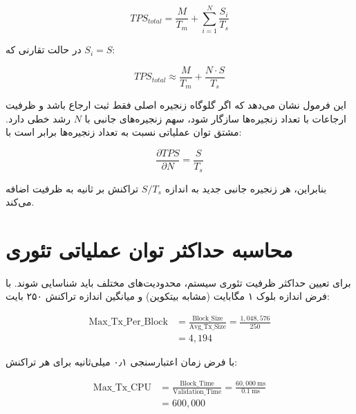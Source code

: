 \begin{latin}
\begin{equation}
TPS_{total} = \frac{M}{T_m} + \sum_{i=1}^{N}\frac{S_i}{T_s}
\end{equation}
\end{latin}

در حالت تقارنی که \(S_i = S\):

\begin{latin}
\begin{equation}
TPS_{total} \approx \frac{M}{T_m} + \frac{N \cdot S}{T_s}
\end{equation}
\end{latin}

این فرمول نشان می‌دهد که اگر گلوگاه زنجیره اصلی فقط ثبت ارجاع باشد و ظرفیت ارجاعات با تعداد زنجیره‌ها سازگار شود، سهم زنجیره‌های جانبی با \(N\) رشد خطی دارد. مشتق توان عملیاتی نسبت به تعداد زنجیره‌ها برابر است با:

\begin{latin}
\begin{equation}
\frac{\partial TPS}{\partial N} = \frac{S}{T_s}
\end{equation}
\end{latin}

بنابراین، هر زنجیره جانبی جدید به اندازه \(S/T_s\) تراکنش بر ثانیه به ظرفیت اضافه می‌کند.

\section{محاسبه حداکثر توان عملیاتی تئوری}

برای تعیین حداکثر ظرفیت تئوری سیستم، محدودیت‌های مختلف باید شناسایی شوند. با فرض اندازه بلوک ۱ مگابایت (مشابه بیتکوین) و میانگین اندازه تراکنش ۲۵۰ بایت:

\begin{latin}
\begin{equation}
\begin{split}
\text{Max\_Tx\_Per\_Block} &= \frac{\text{Block\_Size}}{\text{Avg\_Tx\_Size}} = \frac{1{,}048{,}576}{250} \\
&= 4{,}194
\end{split}
\end{equation}
\end{latin}

با فرض زمان اعتبارسنجی ۰٫۱ میلی‌ثانیه برای هر تراکنش:

\begin{latin}
\begin{equation}
\begin{split}
\text{Max\_Tx\_CPU} &= \frac{\text{Block\_Time}}{\text{Validation\_Time}} = \frac{60{,}000\ \text{ms}}{0.1\ \text{ms}} \\
&= 600{,}000
\end{split}
\end{equation}
\end{latin}

